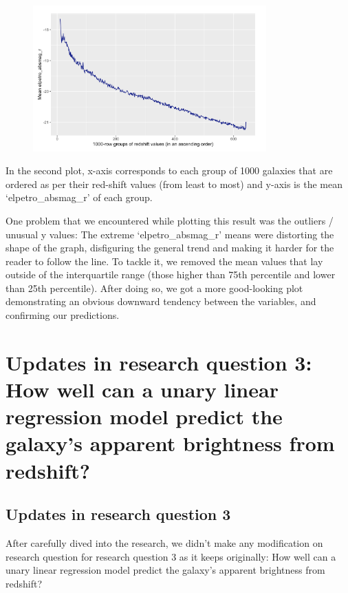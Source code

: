 \documentclass[12pt]{article}
\begin{document}
\begin{figure}[h]
	\centering
	\includegraphics[width=0.8\textwidth]{Graphs/4.png}
\end{figure}

In the second plot, x-axis corresponds to each group of 1000 galaxies that are ordered as per their red-shift values (from least to most) and y-axis is the mean `elpetro\_absmag\_r' of each group. 

One problem that we encountered while plotting this result was the outliers / unusual y values: The extreme `elpetro\_absmag\_r' means were distorting the shape of the graph, disfiguring the general trend and making it harder for the reader to follow the line. To tackle it, we removed the mean values that lay outside of the interquartile range (those higher than 75th percentile and lower than 25th percentile). After doing so, we got a more good-looking plot demonstrating an obvious downward tendency between the variables, and confirming our predictions.

\newpage

\section{Updates in research question 3:  How well can a unary linear regression model predict the galaxy's apparent brightness from redshift?}

\subsection{Updates in research question 3}
After carefully dived into the research, we didn't make any modification on research question for research question 3 as it keeps originally: How well can a unary linear regression model predict the galaxy's apparent brightness from redshift?
\end{document}
